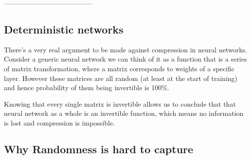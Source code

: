 \documentclass[dissertation.tex]{subfiles}
\begin{document}
---------------------------------------

\subsection{Deterministic networks} \label{ssection:detnet}

There's a very real argument to be made against compression in neural networks.
Consider a generic neural network we can think of it as a function that is a
series of matrix transformation, where a matrix corresponds to weights of a
specific layer. However these matrices are all random (at least at the start of
training) and hence probability of them being invertible is 100\%. 

Knowing that every single matrix is invertible allows us to conclude that that
neural network as a whole is an invertible function, which means no information
is lost and compression is impossible.



\subsection{Why Randomness is hard to capture} \label{ssection:rename}
\end{document}
